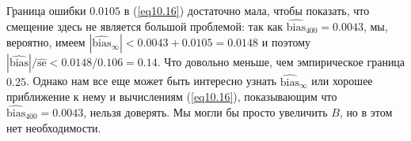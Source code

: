 Граница ошибки $0.0105$ в (\ref{eq10.16}) достаточно мала, чтобы показать, что смещение здесь не является большой проблемой: так как $\widehat{\text{bias}}_{400} = 0.0043$, мы, вероятно, имеем $|\widehat{\text{bias}}_{\infty}| < 0.0043 + 0.0105 = 0.0148$ и поэтому $|\widehat{\text{bias}}|/\widehat{\text{se}} < 0.0148 / 0.106 = 0.14$. Что довольно меньше, чем эмпирическое граница $0.25$. Однако нам все еще может быть интересно узнать $\widehat{\text{bias}}_{\infty}$ или хорошее приближение к нему и вычислениям (\ref{eq10.16}), показывающим что $\widehat{\text{bias}}_{400} = 0.0043$, нельзя доверять. Мы могли бы просто увеличить $B$, но в этом нет необходимости.